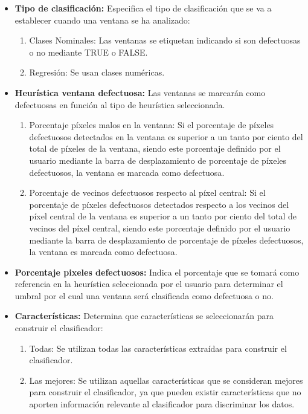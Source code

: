 \begin{itemize}
\item \textbf{Tipo de clasificación:} Especifica el tipo de clasificación que se va a establecer cuando una ventana se ha analizado:

\begin{enumerate}
\item Clases Nominales: Las ventanas se etiquetan indicando si son defectuosas o no mediante TRUE o FALSE.
\item Regresión: Se usan clases numéricas.
\end{enumerate}

\item \textbf{Heurística ventana defectuosa:} Las ventanas se marcarán como defectuosas en función al tipo de heurística seleccionada.

\begin{enumerate}
\item Porcentaje píxeles malos en la ventana: Si el porcentaje de píxeles defectuosos detectados en la ventana es superior a un tanto por ciento del total de píxeles de la ventana, siendo este porcentaje definido por el usuario mediante la barra de desplazamiento de porcentaje de píxeles defectuosos, la ventana es marcada como defectuosa.
\item Porcentaje de vecinos defectuosos respecto al píxel central: Si el porcentaje de píxeles defectuosos detectados respecto a los vecinos del píxel central de la ventana es superior a un tanto por ciento del total de vecinos del píxel central, siendo este porcentaje definido por el usuario mediante la barra de desplazamiento de porcentaje de píxeles defectuosos, la ventana es marcada como defectuosa.
\end{enumerate}

\item \textbf{Porcentaje pixeles defectuosos:} Indica el porcentaje que se tomará como referencia en la heurística seleccionada por el usuario para determinar el umbral por el cual una ventana será clasificada como defectuosa o no.

\item \textbf{Características:} Determina que características se seleccionarán para construir el clasificador:

\begin{enumerate}
\item Todas: Se utilizan todas las características extraídas para construir el clasificador.
\item Las mejores: Se utilizan aquellas características que se consideran mejores para construir el clasificador, ya que pueden existir características que no aporten información relevante al clasificador para discriminar los datos.
\end{enumerate}

\end{itemize}

